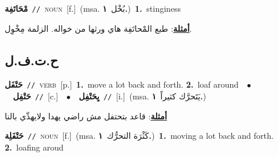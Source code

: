 \documentclass[10pt,a4paper,twoside]{article} %
\begin{document}
\begin{multicols}{2}
{\setlength\topsep{0pt}\textbf{\foreignlanguage{arabic}{مْحَاتَفِة}}\ {\color{gray}\texttt{//}\color{black}}\ \textsc{noun}\ [f.]\ \color{gray}(msa. \foreignlanguage{arabic}{بُخْل}~\foreignlanguage{arabic}{\textbf{١.}})\color{black}\ \textbf{1.}~stinginess\  \begin{flushright}\color{gray}\foreignlanguage{arabic}{\textbf{\underline{\foreignlanguage{arabic}{أمثلة}}}: طبع المْحاتَفِة هاي ورثها من خواله. الزلمة مِخْوِل.}\end{flushright}\color{black}} \vspace{2mm}

\vspace{-3mm}
\subsection*{\color{blue}\foreignlanguage{arabic}{ح.ت.ف.ل}\color{blue}{}} 

{\setlength\topsep{0pt}\textbf{\foreignlanguage{arabic}{حَتْفَل}}\ {\color{gray}\texttt{//}\color{black}}\ \textsc{verb}\ [p.]\ \textbf{1.}~move a lot back and forth.  \textbf{2.}~loaf around\ \ $\bullet$\ \ \setlength\topsep{0pt}\textbf{\foreignlanguage{arabic}{حَتْفِل}}\ {\color{gray}\texttt{//}\color{black}}\ [c.]\ \ $\bullet$\ \ \setlength\topsep{0pt}\textbf{\foreignlanguage{arabic}{يِحَتْفِل}}\ {\color{gray}\texttt{//}\color{black}}\ [i.]\ \color{gray}(msa. \foreignlanguage{arabic}{يَتَحرَّك كثيراً}~\foreignlanguage{arabic}{\textbf{١.}})\color{black}\  \begin{flushright}\color{gray}\foreignlanguage{arabic}{\textbf{\underline{\foreignlanguage{arabic}{أمثلة}}}: قاعد بتحتفل مش راضي يهدا ولايهدِّي بالنا}\end{flushright}\color{black}} \vspace{2mm}

{\setlength\topsep{0pt}\textbf{\foreignlanguage{arabic}{حَتْفَلِة}}\ {\color{gray}\texttt{//}\color{black}}\ \textsc{noun}\ [f.]\ \color{gray}(msa. \foreignlanguage{arabic}{كَثْرَة التحرُّك}~\foreignlanguage{arabic}{\textbf{١.}})\color{black}\ \textbf{1.}~moving a lot back and forth.  \textbf{2.}~loafing aroud\ } \vspace{2mm}


\end{multicols}
\end{document}
